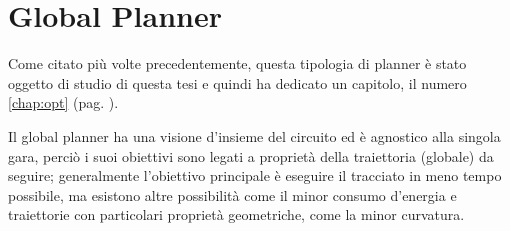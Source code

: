 \section{Global Planner}
Come citato più volte precedentemente, questa tipologia di planner è stato oggetto di studio di questa
tesi e quindi ha dedicato un capitolo, il numero \ref{chap:opt} (pag. \pageref{chap:opt}).

Il global planner ha una visione d'insieme del circuito ed è agnostico alla singola gara, perciò i suoi
obiettivi sono legati a proprietà della traiettoria (globale) da seguire; generalmente l'obiettivo
principale è eseguire il tracciato in meno tempo possibile, ma esistono altre possibilità come il minor
consumo d'energia e traiettorie con particolari proprietà geometriche, come la minor curvatura.






